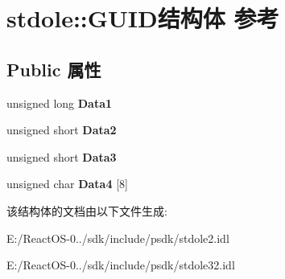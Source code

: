 \hypertarget{structstdole_1_1_g_u_i_d}{}\section{stdole\+:\+:G\+U\+I\+D结构体 参考}
\label{structstdole_1_1_g_u_i_d}
\subsection*{Public 属性}
\begin{DoxyCompactItemize}
\item 
\mbox{\label{structstdole_1_1_g_u_i_d_ae5ebb191bf7e9d05073573020055772d}} 
unsigned long {\bfseries Data1}
\item 
\mbox{\label{structstdole_1_1_g_u_i_d_a37f406e0b0b71e7ff7b64ebd99968644}} 
unsigned short {\bfseries Data2}
\item 
\mbox{\label{structstdole_1_1_g_u_i_d_a7e5eb5b448eb3d7c2bc5db3780de721b}} 
unsigned short {\bfseries Data3}
\item 
\mbox{\label{structstdole_1_1_g_u_i_d_aca2e0de144dc8ba7cc7efd558d65ac1f}} 
unsigned char {\bfseries Data4} \mbox{[}8\mbox{]}
\end{DoxyCompactItemize}


该结构体的文档由以下文件生成\+:\begin{DoxyCompactItemize}
\item 
E\+:/\+React\+O\+S-\/0../sdk/include/psdk/stdole2.\+idl\item 
E\+:/\+React\+O\+S-\/0../sdk/include/psdk/stdole32.\+idl\end{DoxyCompactItemize}
